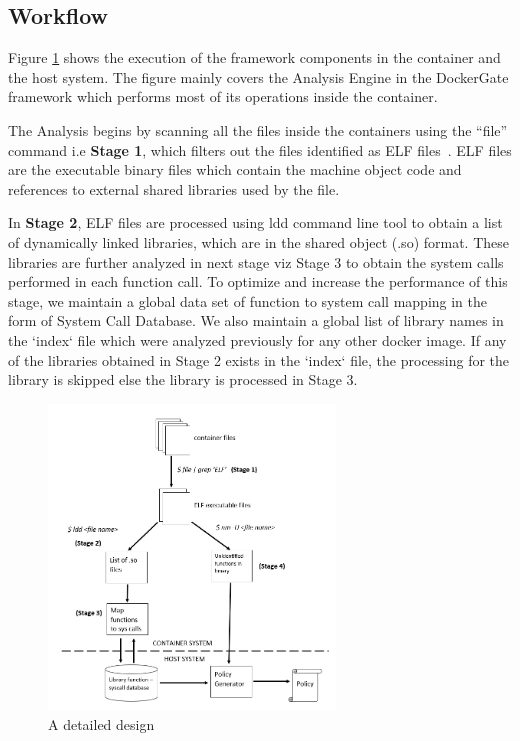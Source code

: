 \subsection{Workflow}

Figure \ref{fig:design_detail} shows the execution of the framework components in the container and the host system. The figure mainly covers the Analysis Engine in the DockerGate framework which performs most of its operations inside the container. 

The Analysis begins by scanning all the files inside the containers using the “file” command i.e \textbf{Stage 1}, which filters out the files identified as ELF files~\cite{elf}. ELF files are the executable binary files which contain the machine object code and references to external shared libraries used by the file.

In \textbf{Stage 2}, ELF files are processed using ldd command line tool to obtain a list of dynamically linked libraries, which are in the shared object (.so) format. These libraries are further analyzed in next stage viz Stage 3 to obtain the system calls performed in  each function call. To optimize and increase the performance of this stage, we maintain a global data set of function to system call mapping in the form of System Call Database. We also maintain a global list of library names in the `index` file which were analyzed previously for any other docker image. If any of the libraries obtained in Stage 2 exists in the `index` file, the processing for the library is skipped else the library is processed in Stage 3.

\begin{figure}[t]
  \centering
  \includegraphics[width=3in]{figs/design_detail}
  \caption{A detailed design}
  \label{fig:design_detail}
\end{figure}

